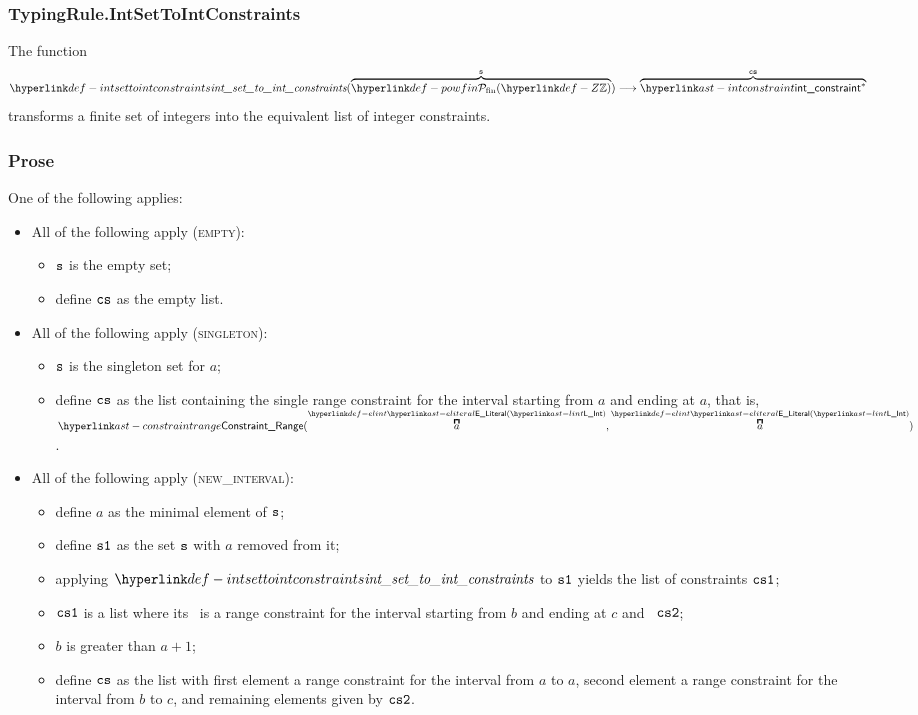 \subsubsection{TypingRule.IntSetToIntConstraints \label{sec:TypingRule.IntSetToIntConstraints}}
\hypertarget{def-intsettointconstraints}{}
The function
\[
\intsettointconstraints(\overname{\powfin{\Z}}{\vs})
\aslto \overname{\intconstraint^*}{\cs}
\]
transforms a finite set of integers into the equivalent list of integer constraints.

\subsubsection{Prose}
One of the following applies:
\begin{itemize}
  \item All of the following apply (\textsc{empty}):
  \begin{itemize}
    \item $\texttt{s}$ is the empty set;
    \item define $\texttt{cs}$ as the empty list.
  \end{itemize}

  \item All of the following apply (\textsc{singleton}):
  \begin{itemize}
    \item $\texttt{s}$ is the singleton set for $a$;
    \item define $\texttt{cs}$ as the list containing the single range constraint for the interval starting from $a$
          and ending at $a$, that is, $\ConstraintRange(\ELInt{a}, \ELInt{a})$.
  \end{itemize}

  \item All of the following apply (\textsc{new\_interval}):
  \begin{itemize}
    \item define $a$ as the minimal element of $\texttt{s}$;
    \item define $\texttt{s1}$ as the set $\texttt{s}$ with $a$ removed from it;
    \item applying $\intsettointconstraints$ to $\texttt{s1}$ yields the list of constraints $\texttt{cs1}$;
    \item $\texttt{cs1}$ is a list where its \head\ is a range constraint for the interval starting from $b$ and ending at $c$
          and \tail\ $\texttt{cs2}$;
    \item $b$ is greater than $a+1$;
    \item define $\texttt{cs}$ as the list with first element a range constraint for the interval from $a$ to $a$,
          second element a range constraint for the interval from $b$ to $c$, and remaining elements given by $\texttt{cs2}$.
  \end{itemize}


\end{itemize}
